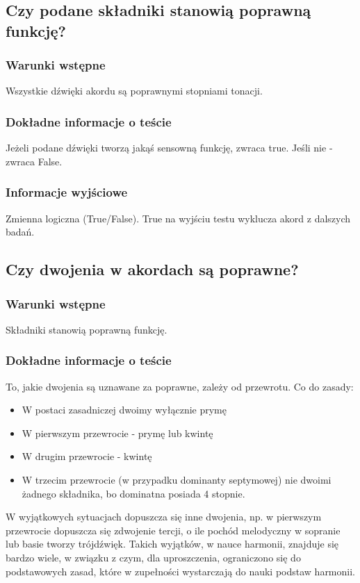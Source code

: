 \documentclass[dokumentacja.tex]{subfiles}
\begin{document}
\subsection{Czy podane składniki stanowią poprawną funkcję?}
\subsubsection{Warunki wstępne}
Wszystkie dźwięki akordu są poprawnymi stopniami tonacji.
\subsubsection{Dokładne informacje o teście}
Jeżeli podane dźwięki tworzą jakąś sensowną funkcję, zwraca true. Jeśli nie - zwraca False.
\subsubsection{Informacje wyjściowe}
Zmienna logiczna (True/False). True na wyjściu testu wyklucza akord z dalszych badań. 


\subsection{Czy dwojenia w akordach są poprawne?}
\subsubsection{Warunki wstępne}
Składniki stanowią poprawną funkcję. 
\subsubsection{Dokładne informacje o teście}
To, jakie dwojenia są uznawane za poprawne, zależy od przewrotu. Co do zasady:
\begin{itemize}
    \item W postaci zasadniczej dwoimy wyłącznie prymę
    \item W pierwszym przewrocie - prymę lub kwintę
    \item W drugim przewrocie - kwintę
    \item W trzecim przewrocie (w przypadku dominanty septymowej) nie dwoimi żadnego składnika, bo dominatna posiada 4 stopnie. 
\end{itemize}
W wyjątkowych sytuacjach dopuszcza się inne dwojenia, np. w pierwszym przewrocie dopuszcza się zdwojenie tercji, o ile pochód melodyczny w sopranie lub basie tworzy trójdźwięk. Takich wyjątków, w nauce harmonii, znajduje się bardzo wiele, w związku z czym, dla uproszczenia, ograniczono się do podstawowych zasad, które w zupełności wystarczają do nauki podstaw harmonii.
\end{document}
